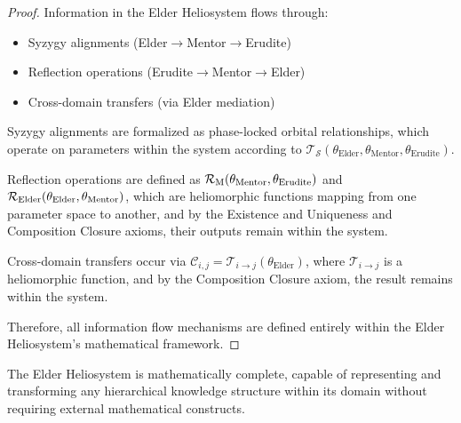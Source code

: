 \begin{proof}
Information in the Elder Heliosystem flows through:
\begin{itemize}
    \item Syzygy alignments (Elder$\rightarrow$Mentor$\rightarrow$Erudite)
    \item Reflection operations (Erudite$\rightarrow$Mentor$\rightarrow$Elder)
    \item Cross-domain transfers (via Elder mediation)
\end{itemize}

Syzygy alignments are formalized as phase-locked orbital relationships, which operate on parameters within the system according to $\mathcal{T}_{\mathcal{S}}(\theta_{\text{Elder}}, \theta_{\text{Mentor}}, \theta_{\text{Erudite}})$.

Reflection operations are defined as $\mathcal{R}_{\text{M}}(\theta_{\text{Mentor}}, \theta_{\text{Erudite}})$ and $\mathcal{R}_{\text{Elder}}(\theta_{\text{Elder}}, \theta_{\text{Mentor}})$, which are heliomorphic functions mapping from one parameter space to another, and by the Existence and Uniqueness and Composition Closure axioms, their outputs remain within the system.

Cross-domain transfers occur via $\mathcal{C}_{i,j} = \mathcal{T}_{i \to j}(\theta_{\text{Elder}})$, where $\mathcal{T}_{i \to j}$ is a heliomorphic function, and by the Composition Closure axiom, the result remains within the system.

Therefore, all information flow mechanisms are defined entirely within the Elder Heliosystem's mathematical framework.
\end{proof}

\begin{theorem}
The Elder Heliosystem is mathematically complete, capable of representing and transforming any hierarchical knowledge structure within its domain without requiring external mathematical constructs.
\end{theorem}

